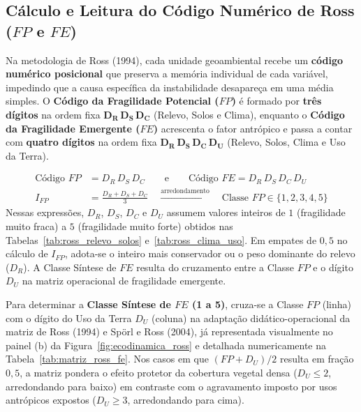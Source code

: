 \subsection{Cálculo e Leitura do Código Numérico de Ross ($FP$ e $FE$)}

Na metodologia de Ross (1994), cada unidade geoambiental recebe um \textbf{código numérico posicional} que preserva a memória individual de cada variável, impedindo que a causa específica da instabilidade desapareça em uma média simples. O \textbf{Código da Fragilidade Potencial ($FP$)} é formado por \textbf{três dígitos} na ordem fixa $\mathbf{D_R\,D_S\,D_C}$ (Relevo, Solos e Clima), enquanto o \textbf{Código da Fragilidade Emergente ($FE$)} acrescenta o fator antrópico e passa a contar com \textbf{quatro dígitos} na ordem fixa $\mathbf{D_R\,D_S\,D_C\,D_U}$ (Relevo, Solos, Clima e Uso da Terra).

\begin{boxFormula}
\begin{align}
  \text{Código } FP &= D_R\,D_S\,D_C \qquad\text{e}\qquad \text{Código } FE = D_R\,D_S\,D_C\,D_U \\[4pt]
  I_{FP} &= \frac{D_R + D_S + D_C}{3} \quad \xrightarrow{\text{arredondamento}} \quad \text{Classe } FP \in \{1, 2, 3, 4, 5\}
\end{align}
Nessas expressões, $D_R$, $D_S$, $D_C$ e $D_U$ assumem valores inteiros de $1$ (fragilidade muito fraca) a $5$ (fragilidade muito forte) obtidos nas Tabelas~\ref{tab:ross_relevo_solos} e~\ref{tab:ross_clima_uso}. Em empates de $0{,}5$ no cálculo de $I_{FP}$, adota-se o inteiro mais conservador ou o peso dominante do relevo ($D_R$). A Classe Síntese de $FE$ resulta do cruzamento entre a Classe $FP$ e o dígito $D_U$ na matriz operacional de fragilidade emergente.
\end{boxFormula}

Para determinar a \textbf{Classe Síntese de $FE$ (1 a 5)}, cruza-se a Classe $FP$ (linha) com o dígito do Uso da Terra $D_U$ (coluna) na adaptação didático-operacional da matriz de Ross (1994) e Spörl e Ross (2004), já representada visualmente no painel (b) da Figura~\ref{fig:ecodinamica_ross} e detalhada numericamente na Tabela~\ref{tab:matriz_ross_fe}. Nos casos em que $(FP + D_U)/2$ resulta em fração $0{,}5$, a matriz pondera o efeito protetor da cobertura vegetal densa ($D_U \le 2$, arredondando para baixo) em contraste com o agravamento imposto por usos antrópicos expostos ($D_U \ge 3$, arredondando para cima).

